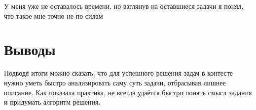 \documentclass[oneside,a4paper,14pt]{extarticle} %
\begin{document}
	У меня уже не оставалось времени, но взглянув на оставшиеся задачи я понял, что такое мне
	точно не по силам
	
	\section*{Выводы}
	Подводя итоги можно сказать, что для успешного решения задач в контесте нужно уметь быстро 
	анализировать саму суть задачи, отбрасывая лишнее описание. Как показала практика, не
	всегда удаётся быстро понять смысл задания и придумать алгоритм решения. 
\end{document}
